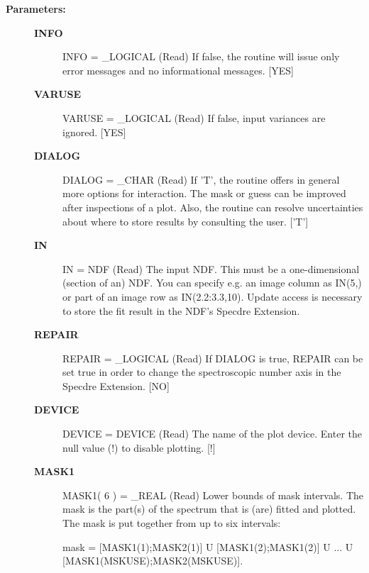 \begin{description}
\begin{description}
\item [\textbf{Parameters:}]
\begin{description}
\item [\textbf{INFO}]
INFO = \_LOGICAL (Read)
   If false, the routine will issue only error messages and no
   informational messages. [YES]
\item [\textbf{VARUSE}]
VARUSE = \_LOGICAL (Read)
   If false, input variances are ignored. [YES]
\item [\textbf{DIALOG}]
DIALOG = \_CHAR (Read)
   If 'T', the routine offers in general more options for
   interaction. The mask or guess can be improved after
   inspections of a plot. Also, the routine can resolve
   uncertainties about where to store results by consulting the
   user. ['T']
\item [\textbf{IN}]
IN = NDF (Read)
   The input NDF. This must be a one-dimensional (section of an)
   NDF. You can specify e.g. an image column as IN(5,) or part of
   an image row as IN(2.2:3.3,10). Update access is necessary to
   store the fit result in the NDF's Specdre Extension.
\item [\textbf{REPAIR}]
REPAIR = \_LOGICAL (Read)
   If DIALOG is true, REPAIR can be set true in order to change
   the spectroscopic number axis in the Specdre Extension. [NO]
\item [\textbf{DEVICE}]
DEVICE = DEVICE (Read)
   The name of the plot device. Enter the null value (!) to
   disable plotting. [!]
\item [\textbf{MASK1}]
MASK1( 6 ) = \_REAL (Read)
   Lower bounds of mask intervals. The mask is the part(s) of the
   spectrum that is (are) fitted and plotted. The mask is put
   together from up to six intervals:

      mask = [MASK1(1);MASK2(1)] U [MASK1(2);MASK1(2)]
           U ...
           U [MASK1(MSKUSE);MASK2(MSKUSE)].


\end{description}
\end{description}
\end{description}
